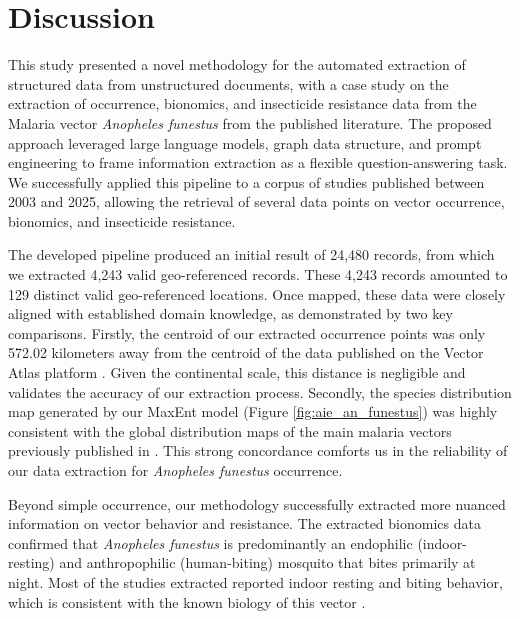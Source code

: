 \documentclass{article}
\begin{document}
\section{Discussion}
\label{sec:discussion}
\par 
This study presented a novel methodology for the automated extraction of structured data from unstructured documents, with a case study on the extraction of occurrence, bionomics, and insecticide resistance data from the Malaria vector \textit{Anopheles funestus} from the published literature. 
The proposed approach leveraged large language models, graph data structure, and prompt engineering to frame information extraction as a flexible question-answering task. 
We successfully applied this pipeline to a corpus of studies published between 2003 and 2025, allowing the retrieval of several data points on vector occurrence, bionomics, and insecticide resistance.
\par 
The developed pipeline produced an initial result of 24,480 records, from which we extracted 4,243 valid geo-referenced records. 
These 4,243 records amounted to 129 distinct valid geo-referenced locations. 
Once mapped, these data were closely aligned with established domain knowledge, as demonstrated by two key comparisons. 
Firstly, the centroid of our extracted occurrence points was only 572.02 kilometers away from the centroid of the data published on the Vector Atlas platform \citep{2025.VE.VAP}. 
Given the continental scale, this distance is negligible and validates the accuracy of our extraction process. 
Secondly, the species distribution map generated by our MaxEnt model (Figure \ref{fig:aie_an_funestus}) was highly consistent with the global distribution maps of the main malaria vectors previously published in \citep{2012.ME.AGM}. 
This strong concordance comforts us in the reliability of our data extraction for \textit{Anopheles funestus} occurrence.
\par 
Beyond simple occurrence, our methodology successfully extracted more nuanced information on vector behavior and resistance. 
The extracted bionomics data confirmed that \textit{Anopheles funestus} is predominantly an endophilic (indoor-resting) and anthropophilic (human-biting) mosquito that bites primarily at night. 
Most of the studies extracted reported indoor resting and biting behavior, which is consistent with the known biology of this vector \citep{2024.AJ.TBO, 2025.GR.STI}. 
\end{document}
